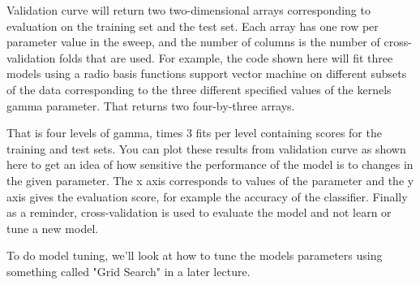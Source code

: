 \begin{multicols}{2}
Validation curve will return two two-dimensional arrays corresponding to evaluation on the training set and the test set. Each array has one row per parameter value in the sweep, and the number of columns is the number of cross-validation folds that are used. For example, the code shown here will fit three models using a radio basis functions support vector machine on different subsets of the data corresponding to the three different specified values of the kernels gamma parameter. That returns two four-by-three arrays. 

That is four levels of gamma, times 3 fits per level containing scores for the training and test sets. You can plot these results from validation curve as shown here to get an idea of how sensitive the performance of the model is to changes in the given parameter. The x axis corresponds to values of the parameter and the y axis gives the evaluation score, for example the accuracy of the classifier. Finally as a reminder, cross-validation is used to evaluate the model and not learn or tune a new model. 

To do model tuning, we'll look at how to tune the models parameters using something called "Grid Search" in a later lecture. 
\end{multicols}

